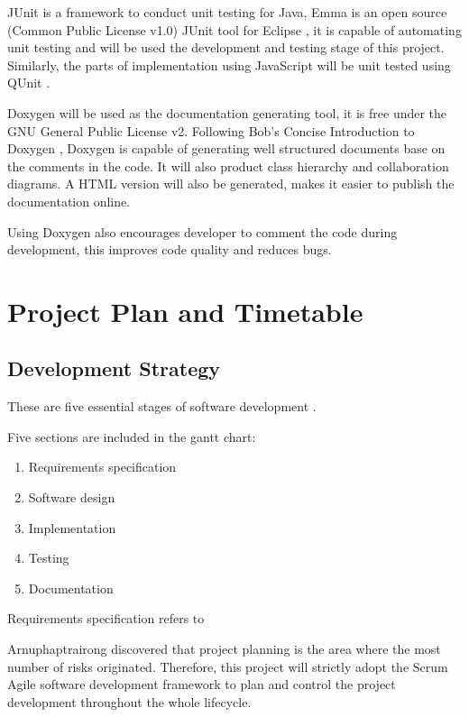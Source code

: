 \documentclass[doc,natbib]{apa6}
\begin{document}
JUnit is a framework to conduct unit testing for Java, Emma is an open source (Common Public License v1.0) JUnit tool for Eclipse \citep{Roubtsov2010}, it is capable of automating unit testing and will be used the development and testing stage of this project. Similarly, the parts of implementation using JavaScript will be unit tested using QUnit \citep{qunit}.

Doxygen \citep{Doxygen} will be used as the documentation generating tool, it is free under the GNU General Public License v2. Following Bob's Concise Introduction to Doxygen \citep{Laramee2011}, Doxygen is capable of generating well structured documents base on the comments in the code. It will also product class hierarchy and collaboration diagrams. A HTML version will also be generated, makes it easier to publish the documentation online.

Using Doxygen also encourages developer to comment the code during development, this improves code quality and reduces bugs.

\section{Project Plan and Timetable}
\label{sec4}
\subsection{Development Strategy}
\label{Development Strategy}

These are five essential stages of software development \citep[p .11]{Laramee2011a, Vliet2007}.

Five sections are included in the gantt chart:
\begin{enumerate}
	\item Requirements specification
	\item Software design
	\item Implementation
	\item Testing
	\item Documentation
\end{enumerate}

Requirements specification refers to 

Arnuphaptrairong \citep{Arnuphaptrairong2011} discovered that project planning is the area where the most number of risks originated. Therefore, this project will strictly adopt the Scrum Agile software development framework to plan and control the project development throughout the whole lifecycle.
\end{document}

